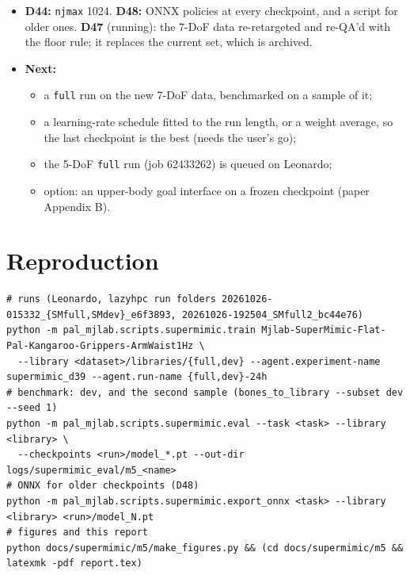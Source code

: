 \documentclass[10pt]{article}
\begin{document}
\begin{itemize}
  \item \textbf{D44:} \texttt{njmax} 1024. \textbf{D48:} ONNX policies at every checkpoint, and a script for
  older ones. \textbf{D47} (running): the 7-DoF data re-retargeted and re-QA'd with the floor rule; it
  replaces the current set, which is archived.
  \item \textbf{Next:}
  \begin{itemize}
    \item a \texttt{full} run on the new 7-DoF data, benchmarked on a sample of it;
    \item a learning-rate schedule fitted to the run length, or a weight average, so the last checkpoint
    is the best (needs the user's go);
    \item the 5-DoF \texttt{full} run (job 62433262) is queued on Leonardo;
    \item option: an upper-body goal interface on a frozen checkpoint (paper Appendix B).
  \end{itemize}
\end{itemize}

\appendix
\section{Reproduction}

\begin{footnotesize}
\begin{verbatim}
# runs (Leonardo, lazyhpc run folders 20261026-015332_{SMfull,SMdev}_e6f3893, 20261026-192504_SMfull2_bc44e76)
python -m pal_mjlab.scripts.supermimic.train Mjlab-SuperMimic-Flat-Pal-Kangaroo-Grippers-ArmWaist1Hz \
  --library <dataset>/libraries/{full,dev} --agent.experiment-name supermimic_d39 --agent.run-name {full,dev}-24h
# benchmark: dev, and the second sample (bones_to_library --subset dev --seed 1)
python -m pal_mjlab.scripts.supermimic.eval --task <task> --library <library> \
  --checkpoints <run>/model_*.pt --out-dir logs/supermimic_eval/m5_<name>
# ONNX for older checkpoints (D48)
python -m pal_mjlab.scripts.supermimic.export_onnx <task> --library <library> <run>/model_N.pt
# figures and this report
python docs/supermimic/m5/make_figures.py && (cd docs/supermimic/m5 && latexmk -pdf report.tex)
\end{verbatim}
\end{footnotesize}
\end{document}
